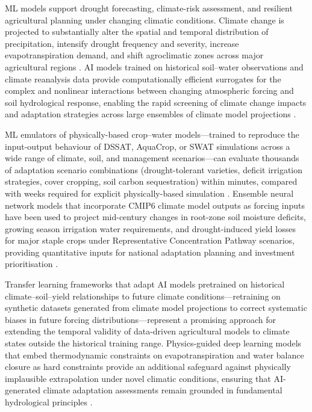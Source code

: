 \documentclass[land,article,submit,pdftex,moreauthors]{Definitions/mdpi}
\numberwithin{equation}{section}
\begin{document}
ML models support drought forecasting, climate-risk assessment, and resilient agricultural planning under changing climatic conditions. Climate change is projected to substantially alter the spatial and temporal distribution of precipitation, intensify drought frequency and severity, increase evapotranspiration demand, and shift agroclimatic zones across major agricultural regions \citep{ipcc2022ar6}. AI models trained on historical soil--water observations and climate reanalysis data provide computationally efficient surrogates for the complex and nonlinear interactions between changing atmospheric forcing and soil hydrological response, enabling the rapid screening of climate change impacts and adaptation strategies across large ensembles of climate model projections \citep{trnka2022soil}.

ML emulators of physically-based crop--water models---trained to reproduce the input-output behaviour of DSSAT, AquaCrop, or SWAT simulations across a wide range of climate, soil, and management scenarios---can evaluate thousands of adaptation scenario combinations (drought-tolerant varieties, deficit irrigation strategies, cover cropping, soil carbon sequestration) within minutes, compared with weeks required for explicit physically-based simulation \citep{Meng}. Ensemble neural network models that incorporate CMIP6 climate model outputs as forcing inputs have been used to project mid-century changes in root-zone soil moisture deficits, growing season irrigation water requirements, and drought-induced yield losses for major staple crops under Representative Concentration Pathway scenarios, providing quantitative inputs for national adaptation planning and investment prioritisation \citep{trnka2022soil}.

Transfer learning frameworks that adapt AI models pretrained on historical climate--soil--yield relationships to future climate conditions---retraining on synthetic datasets generated from climate model projections to correct systematic biases in future forcing distributions---represent a promising approach for extending the temporal validity of data-driven agricultural models to climate states outside the historical training range. Physics-guided deep learning models that embed thermodynamic constraints on evapotranspiration and water balance closure as hard constraints provide an additional safeguard against physically implausible extrapolation under novel climatic conditions, ensuring that AI-generated climate adaptation assessments remain grounded in fundamental hydrological principles \citep{willard2022integrating}.
\end{document}
